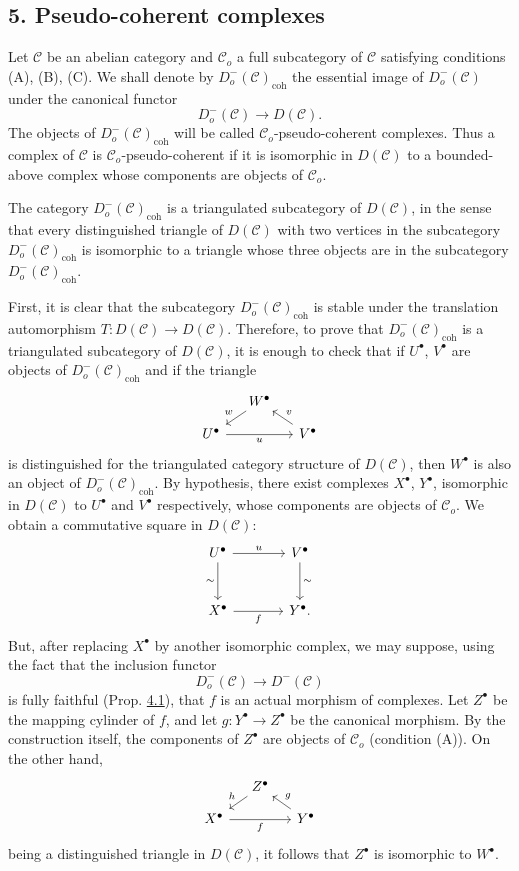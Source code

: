 \documentclass[11pt]{article}
\providecommand{\coh}{\mathrm{coh}}
\providecommand{\cC}{\mathcal C}
\providecommand{\cC}{\mathcal C}
\providecommand{\coh}{\mathrm{coh}}
\begin{document}
\subsection*{5. Pseudo-coherent complexes}\label{sga5:VIII:subsection:5}

Let $\cC$ be an abelian category and $\cC_o$ a full subcategory of $\cC$ satisfying conditions (A), (B), (C). We shall denote by $D_o^-(\cC)_{\coh}$ the essential image of $D_o^-(\cC)$ under the canonical functor
\[
D_o^-(\cC)\longrightarrow D(\cC).
\]
The objects of $D_o^-(\cC)_{\coh}$ will be called $\cC_o$-pseudo-coherent complexes. Thus a complex of $\cC$ is $\cC_o$-pseudo-coherent if it is isomorphic in $D(\cC)$ to a bounded-above complex whose components are objects of $\cC_o$.

The category $D_o^-(\cC)_{\coh}$ is a triangulated subcategory of $D(\cC)$, in the sense that every distinguished triangle of $D(\cC)$ with two vertices in the subcategory $D_o^-(\cC)_{\coh}$ is isomorphic to a triangle whose three objects are in the subcategory $D_o^-(\cC)_{\coh}$.

First, it is clear that the subcategory $D_o^-(\cC)_{\coh}$ is stable under the translation automorphism $T:D(\cC)\to D(\cC)$. Therefore, to prove that $D_o^-(\cC)_{\coh}$ is a triangulated subcategory of $D(\cC)$, it is enough to check that if $U^\bullet$, $V^\bullet$ are objects of $D_o^-(\cC)_{\coh}$ and if the triangle
\[
\begin{tikzcd}[column sep=small,row sep=small]
& W^\bullet \arrow[dl,"w"']\\
U^\bullet \arrow[rr,"u"']&& V^\bullet \arrow[ul,"v"']
\end{tikzcd}
\]
is distinguished for the triangulated category structure of $D(\cC)$, then $W^\bullet$ is also an object of $D_o^-(\cC)_{\coh}$. By hypothesis, there exist complexes $X^\bullet$, $Y^\bullet$, isomorphic in $D(\cC)$ to $U^\bullet$ and $V^\bullet$ respectively, whose components are objects of $\cC_o$. We obtain a commutative square in $D(\cC)$:
\[
\begin{tikzcd}[column sep=large,row sep=large]
U^\bullet \arrow[r,"u"] \arrow[d,"\sim"']&V^\bullet \arrow[d,"\sim"]\\
X^\bullet \arrow[r,"f"']&Y^\bullet .
\end{tikzcd}
\]
But, after replacing $X^\bullet$ by another isomorphic complex, we may suppose, using the fact that the inclusion functor
\[
D_o^-(\cC)\longrightarrow D^-(\cC)
\]
is fully faithful (Prop. \hyperref[sga5:VIII:proposition:4.1]{4.1}), that $f$ is an actual morphism of complexes. Let $Z^\bullet$ be the mapping cylinder of $f$, and let $g:Y^\bullet\to Z^\bullet$ be the canonical morphism. By the construction itself, the components of $Z^\bullet$ are objects of $\cC_o$ (condition (A)). On the other hand,
\[
\begin{tikzcd}[column sep=small,row sep=small]
&Z^\bullet \arrow[dl,"h"']\\
X^\bullet \arrow[rr,"f"']&&Y^\bullet \arrow[ul,"g"']
\end{tikzcd}
\]
being a distinguished triangle in $D(\cC)$, it follows that $Z^\bullet$ is isomorphic to $W^\bullet$.
\end{document}
